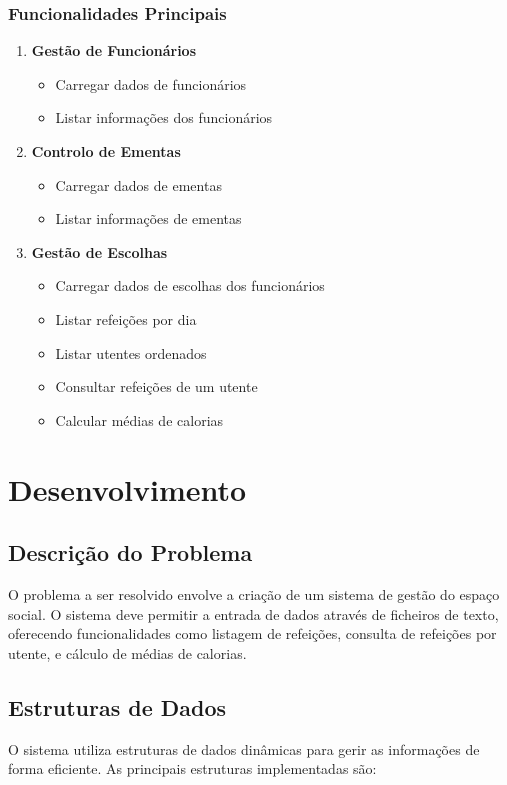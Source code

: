 \documentclass[a4paper,12pt]{report}
\begin{document}
\subsection{Funcionalidades Principais}
\begin{enumerate}
    \item \textbf{Gestão de Funcionários}
    \begin{itemize}
        \item Carregar dados de funcionários
        \item Listar informações dos funcionários
    \end{itemize}

    \item \textbf{Controlo de Ementas}
    \begin{itemize}
        \item Carregar dados de ementas
        \item Listar informações de ementas
    \end{itemize}

    \item \textbf{Gestão de Escolhas}
    \begin{itemize}
        \item Carregar dados de escolhas dos funcionários
        \item Listar refeições por dia
        \item Listar utentes ordenados
        \item Consultar refeições de um utente
        \item Calcular médias de calorias
    \end{itemize}
\end{enumerate}

\chapter{Desenvolvimento}
\section{Descrição do Problema}
O problema a ser resolvido envolve a criação de um sistema de gestão do espaço social. O sistema deve permitir a entrada de dados através de ficheiros de texto, oferecendo funcionalidades como listagem de refeições, consulta de refeições por utente, e cálculo de médias de calorias.

\section{Estruturas de Dados}
O sistema utiliza estruturas de dados dinâmicas para gerir as informações de forma eficiente. As principais estruturas implementadas são:
\end{document}

